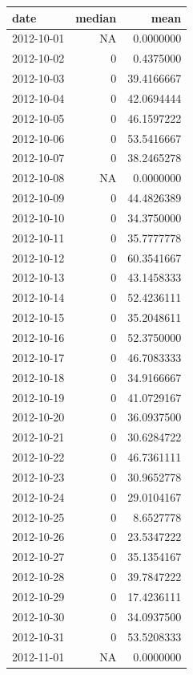 \documentclass[
]{article}
\begin{document}
\begin{table}
\centering
\begin{tabular}[t]{l|r|r}
\hline
date & median & mean\\
\hline
2012-10-01 & NA & 0.0000000\\
\hline
2012-10-02 & 0 & 0.4375000\\
\hline
2012-10-03 & 0 & 39.4166667\\
\hline
2012-10-04 & 0 & 42.0694444\\
\hline
2012-10-05 & 0 & 46.1597222\\
\hline
2012-10-06 & 0 & 53.5416667\\
\hline
2012-10-07 & 0 & 38.2465278\\
\hline
2012-10-08 & NA & 0.0000000\\
\hline
2012-10-09 & 0 & 44.4826389\\
\hline
2012-10-10 & 0 & 34.3750000\\
\hline
2012-10-11 & 0 & 35.7777778\\
\hline
2012-10-12 & 0 & 60.3541667\\
\hline
2012-10-13 & 0 & 43.1458333\\
\hline
2012-10-14 & 0 & 52.4236111\\
\hline
2012-10-15 & 0 & 35.2048611\\
\hline
2012-10-16 & 0 & 52.3750000\\
\hline
2012-10-17 & 0 & 46.7083333\\
\hline
2012-10-18 & 0 & 34.9166667\\
\hline
2012-10-19 & 0 & 41.0729167\\
\hline
2012-10-20 & 0 & 36.0937500\\
\hline
2012-10-21 & 0 & 30.6284722\\
\hline
2012-10-22 & 0 & 46.7361111\\
\hline
2012-10-23 & 0 & 30.9652778\\
\hline
2012-10-24 & 0 & 29.0104167\\
\hline
2012-10-25 & 0 & 8.6527778\\
\hline
2012-10-26 & 0 & 23.5347222\\
\hline
2012-10-27 & 0 & 35.1354167\\
\hline
2012-10-28 & 0 & 39.7847222\\
\hline
2012-10-29 & 0 & 17.4236111\\
\hline
2012-10-30 & 0 & 34.0937500\\
\hline
2012-10-31 & 0 & 53.5208333\\
\hline
2012-11-01 & NA & 0.0000000\\

\end{tabular}
\end{table}
\end{document}
